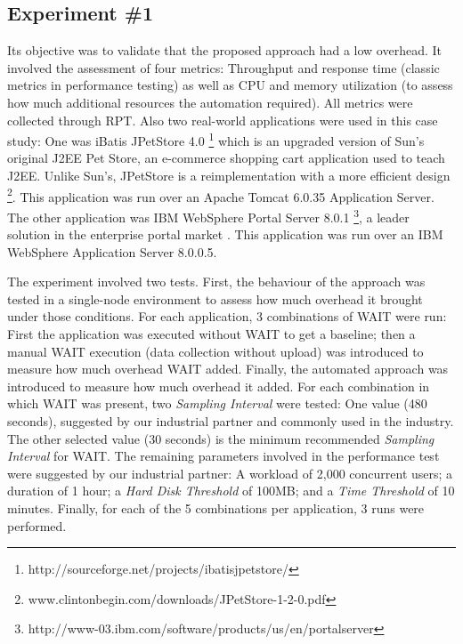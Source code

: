 \documentclass[runningheads,a4paper]{llncs}
\begin{document}
\subsection{Experiment \#1}
\vspace{-5pt}
Its objective was to validate that the proposed approach had a low overhead.
It involved the assessment of four metrics: Throughput and response time
(classic metrics in performance testing) as well as CPU and memory utilization
(to assess how much additional resources the automation required). All metrics
were collected through RPT. Also two real-world applications were used in this
case study: One was iBatis JPetStore 4.0
\footnote{http://sourceforge.net/projects/ibatisjpetstore/} which is an upgraded
version of Sun's original J2EE Pet Store, an e-commerce shopping cart
application used to teach J2EE. Unlike Sun’s, JPetStore is a reimplementation
with a more efficient design
\footnote{www.clintonbegin.com/downloads/JPetStore-1-2-0.pdf‎}. This application
was run over an Apache Tomcat 6.0.35 Application Server.
The other application was IBM WebSphere Portal Server 8.0.1 \footnote{http://www-03.ibm.com/software/products/us/en/portalserver},
a leader solution in the enterprise portal market \cite{Gartner2008}. This
application was run over an IBM WebSphere Application Server 8.0.0.5.

The experiment involved two tests. First, the behaviour of
the approach was tested in a single-node environment to assess how much
overhead it brought under those conditions. For each application, 3 combinations
of WAIT were run: First the application was executed without WAIT to get a
baseline; then a manual WAIT execution (data collection without upload) was
introduced to measure how much overhead WAIT added. Finally, the automated
approach was introduced to measure how much overhead it added. For each
combination in which WAIT was present, two \emph{Sampling Interval} were tested:
One value (480 seconds), suggested by our industrial partner and commonly
used in the industry. The other selected value (30 seconds) is the minimum
recommended \emph{Sampling Interval} for WAIT. The remaining parameters involved
in the performance test were suggested by our industrial partner: A workload of
2,000 concurrent users; a duration of 1 hour; a \emph{Hard Disk Threshold} of
100MB; and a \emph{Time Threshold} of 10 minutes. Finally, for each of the 5
combinations per application, 3 runs were performed.
\end{document}
